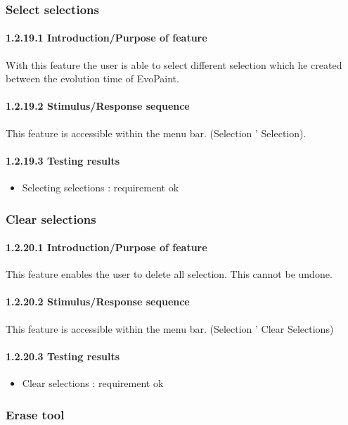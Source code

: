 \documentclass[titlepage,12pt]{scrartcl}
\begin{document}
\subsubsection{Select selections}
\paragraph{1.2.19.1 Introduction/Purpose of feature}
With this feature the user is able to select different selection which he created between the evolution time of EvoPaint.
\paragraph{1.2.19.2 Stimulus/Response sequence}
This feature is accessible within the menu bar. (Selection ' Selection).
\paragraph{1.2.19.3 Testing results}
\begin{itemize}
	\item Selecting selections 	: requirement ok
\end{itemize}

\subsubsection{Clear selections}
\paragraph{1.2.20.1 Introduction/Purpose of feature}
This feature enables the user to delete all selection. This cannot be undone.
\paragraph{1.2.20.2 Stimulus/Response sequence}
This feature is accessible within the menu bar. (Selection ' Clear Selections)
\paragraph{1.2.20.3 Testing results}
\begin{itemize}
	\item Clear selections 	: requirement ok
\end{itemize}

\subsubsection{Erase tool}
\end{document}
